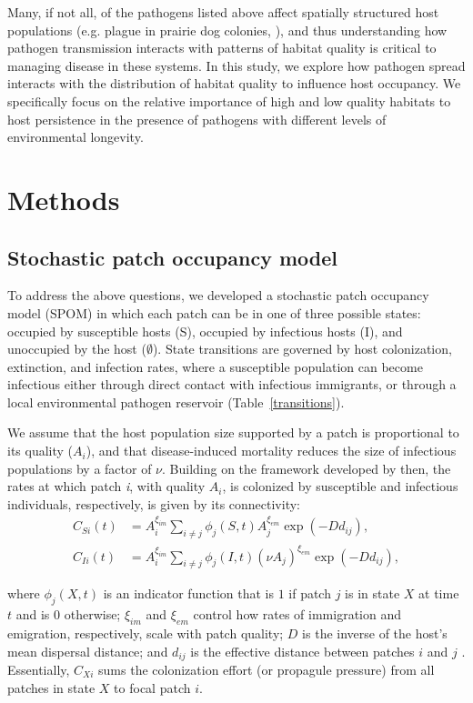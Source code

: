 \documentclass{article}
\begin{document}
Many, if not all, of the pathogens listed above affect spatially structured host populations (e.g. plague in prairie dog colonies, \cite{George2013}), and thus understanding how pathogen transmission interacts with patterns of habitat quality is critical to managing disease in these systems.  In this study, we explore how pathogen spread interacts with the distribution of habitat quality to influence host occupancy.  We specifically focus on the relative importance of high and low quality habitats to host persistence in the presence of pathogens with different levels of environmental longevity. 

\section{Methods}
\label{methods}

\subsection{Stochastic patch occupancy model}


To address the above questions, we developed a stochastic patch occupancy model (SPOM) in which each patch can be in one of three possible states: occupied by susceptible hosts (S), occupied by infectious hosts (I), and unoccupied by the host ($\emptyset$).  State transitions are governed by host colonization, extinction, and infection rates, where a susceptible population can become infectious either through direct contact with infectious immigrants, or through a local environmental pathogen reservoir (Table~\ref{transitions}).

We assume that the host population size supported by a patch is proportional to its quality ($A_i$), and that disease-induced mortality reduces the size of infectious populations by a factor of $\nu$.  Building on the framework developed by \cite{Hanski2003} then, the rates at which patch \emph{i}, with quality $A_i$, is colonized by susceptible and infectious individuals, respectively, is given by its connectivity:
\begin{align}
C_{Si}(t) &= A_i^{\xi_{im}} \sum_{i\neq j }\phi_j(S, t)A_j^{\xi_{em}}\exp(-D d_{ij}),\\
C_{Ii}(t) &= A_i^{\xi_{im}} \sum_{i\neq j }\phi_j(I, t)(\nu A_j) ^{\xi_{em}}\exp(-D d_{ij}),
\label{connectivity}
\end{align}

where $\phi_j(X, t)$ is an indicator function that is $1$ if patch $j$ is in state $X$ at time $t$ and is $0$ otherwise; $\xi_{im}$ and $\xi_{em}$ control how rates of immigration and emigration, respectively, scale with patch quality; $D$ is the inverse of the host's mean dispersal distance; and $d_{ij}$ is the effective distance between patches $i$ and $j$ .  Essentially, $C_{Xi}$ sums the colonization effort (or propagule pressure) from all patches in state $X$ to focal patch $i$.  
\end{document}
